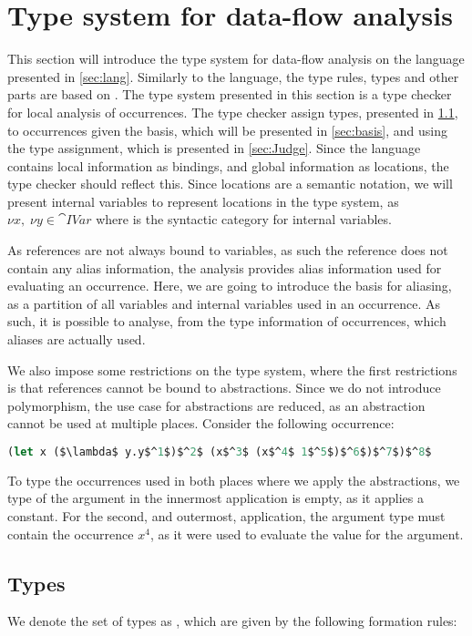 \documentclass[../../master.tex]{subfiles}
\begin{document}
\newpage
\section{Type system for data-flow analysis}\label{sec:TypeSys}
This section will introduce the type system for data-flow analysis on the language presented in \cref{sec:lang}.
Similarly to the language, the type rules, types and other parts are based on \cite{DVNicky}.
The type system presented in this section is a type checker for local analysis of occurrences.
The type checker assign types, presented in \cref{sec:types}, to occurrences given the basis, which will be presented in \cref{sec:basis}, and using the type assignment, which is presented in \cref{sec:Judge}.
Since the language contains local information as bindings, and global information as locations, the type checker should reflect this.
Since locations are a semantic notation, we will present internal variables to represent locations in the type system, as $\nu x,\; \nu y\in\cat{IVar}$ where  is the syntactic category for internal variables.

As references are not always bound to variables, as such the reference does not contain any alias information, the analysis provides alias information used for evaluating an occurrence.
Here, we are going to introduce the basis for aliasing, as a partition of all variables and internal variables used in an occurrence.
As such, it is possible to analyse, from the type information of occurrences, which aliases are actually used.

We also impose some restrictions on the type system, where the first restrictions is that references cannot be bound to abstractions.
Since we do not introduce polymorphism, the use case for abstractions are reduced, as an abstraction cannot be used at multiple places.
Consider the following occurrence:
\begin{lstlisting}[language=Caml, mathescape=true]
(let x ($\lambda$ y.y$^1$)$^2$ (x$^3$ (x$^4$ 1$^5$)$^6$)$^7$)$^8$
\end{lstlisting}
To type the occurrences used in both places where we apply the abstractions, we type of the argument in the innermost application is empty, as it applies a constant.
For the second, and outermost, application, the argument type must contain the occurrence $x^4$, as it were used to evaluate the value for the argument.

\subsection{Types}\label{sec:types}
We denote the set of types as , which are given by the following formation rules:
\end{document}

